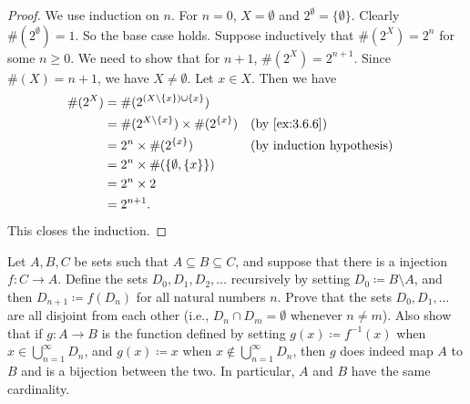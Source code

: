 \begin{proof}
  We use induction on \(n\).
  For \(n = 0\), \(X = \emptyset\) and \(2^{\emptyset} = \{\emptyset\}\).
  Clearly \(\#(2^{\emptyset}) = 1\).
  So the base case holds.
  Suppose inductively that \(\#(2^X) = 2^n\) for some \(n \geq 0\).
  We need to show that for \(n + 1\), \(\#(2^X) = 2^{n + 1}\).
  Since \(\#(X) = n + 1\), we have \(X \neq \emptyset\).
  Let \(x \in X\).
  Then we have
  \begin{align*}
    \#(2^X) & = \#(2^{(X \setminus \{x\}) \cup \{x\}})                                               \\
            & = \#(2^{X \setminus \{x\}}) \times \#(2^{\{x\}}) &  & \text{(by \cref{ex:3.6.6})}      \\
            & = 2^n \times \#(2^{\{x\}})                       &  & \text{(by induction hypothesis)} \\
            & = 2^n \times \#(\{\emptyset, \{x\}\})                                                  \\
            & = 2^n \times 2                                                                         \\
            & = 2^{n + 1}.
  \end{align*}
  This closes the induction.
\end{proof}

\begin{ex}\label{ex:8.3.2}
  Let \(A, B, C\) be sets such that \(A \subseteq B \subseteq C\), and suppose that there is a injection \(f : C \to A\).
  Define the sets \(D_0, D_1, D_2, \dots\) recursively by setting \(D_0 \coloneqq B \setminus A\), and then \(D_{n + 1} \coloneqq f(D_n)\) for all natural numbers \(n\).
  Prove that the sets \(D_0, D_1, \dots\) are all disjoint from each other
  (i.e., \(D_n \cap D_m = \emptyset\) whenever \(n \neq m\)).
  Also show that if \(g : A \to B\) is the function defined by setting \(g(x) \coloneqq f^{-1}(x)\) when \(x \in \bigcup_{n = 1}^\infty D_n\), and \(g(x) \coloneqq x\) when \(x \notin \bigcup_{n = 1}^\infty D_n\), then \(g\) does indeed map \(A\) to \(B\) and is a bijection between the two.
  In particular, \(A\) and \(B\) have the same cardinality.
\end{ex}

